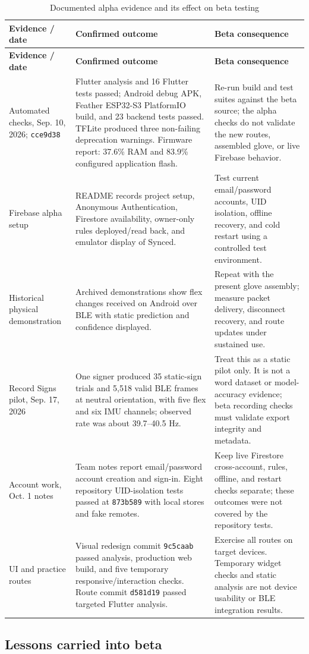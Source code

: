 \documentclass[10pt,letterpaper]{article}
\begin{document}
\begin{longtable}{@{}P{1.15in}P{3.28in}P{2.55in}@{}}
\caption{Documented alpha evidence and its effect on beta testing}\label{tab:alpha}\\
\toprule
\textbf{Evidence / date} & \textbf{Confirmed outcome} & \textbf{Beta consequence}\\\midrule
\endfirsthead
\toprule\textbf{Evidence / date} & \textbf{Confirmed outcome} & \textbf{Beta consequence}\\\midrule
\endhead
\bottomrule\endlastfoot
Automated checks, Sep. 10, 2026; \texttt{cce9d38} & Flutter analysis and 16 Flutter tests passed; Android debug APK, Feather ESP32-S3 PlatformIO build, and 23 backend tests passed. TFLite produced three non-failing deprecation warnings. Firmware report: 37.6\% RAM and 83.9\% configured application flash. & Re-run build and test suites against the beta source; the alpha checks do not validate the new routes, assembled glove, or live Firebase behavior. \\
Firebase alpha setup & README records project setup, Anonymous Authentication, Firestore availability, owner-only rules deployed/read back, and emulator display of Synced. & Test current email/password accounts, UID isolation, offline recovery, and cold restart using a controlled test environment. \\
Historical physical demonstration & Archived demonstrations show flex changes received on Android over BLE with static prediction and confidence displayed. & Repeat with the present glove assembly; measure packet delivery, disconnect recovery, and route updates under sustained use. \\
Record Signs pilot, Sep. 17, 2026 & One signer produced 35 static-sign trials and 5,518 valid BLE frames at neutral orientation, with five flex and six IMU channels; observed rate was about 39.7--40.5 Hz. & Treat this as a static pilot only. It is not a word dataset or model-accuracy evidence; beta recording checks must validate export integrity and metadata. \\
Account work, Oct. 1 notes & Team notes report email/password account creation and sign-in. Eight repository UID-isolation tests passed at \texttt{873b589} with local stores and fake remotes. & Keep live Firestore cross-account, rules, offline, and restart checks separate; these outcomes were not covered by the repository tests. \\
UI and practice routes & Visual redesign commit \texttt{9c5caab} passed analysis, production web build, and five temporary responsive/interaction checks. Route commit \texttt{d581d19} passed targeted Flutter analysis. & Exercise all routes on target devices. Temporary widget checks and static analysis are not device usability or BLE integration results. \\
\end{longtable}\subsection{Lessons carried into beta}
\end{document}
